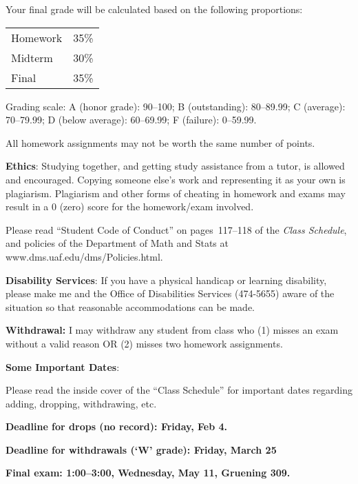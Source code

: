 \documentclass{article}
\begin{document}
Your final grade will be calculated based on the following proportions:

\hskip2cm
\begin{tabular}{ll}
Homework & 35\%\\
Midterm & 30\%\\
Final & 35\%
\end{tabular}

Grading scale:
A (honor grade): 90--100;
B (outstanding): 80--89.99;
C (average): 70--79.99;
D (below average): 60--69.99;
F (failure): 0--59.99.

All homework assignments may not be worth the same number of points.

\bigskip
\textbf{\large Ethics}:
Studying together, and getting study assistance from a tutor, is allowed
and encouraged. Copying someone else's work and representing it as your
own is plagiarism. Plagiarism and other forms of cheating in homework
and exams may result in a 0 (zero) score for the homework/exam
involved.

Please read ``Student Code of Conduct'' on pages~117--118 of the
\emph{Class Schedule}, and policies of the Department of Math and Stats
at www.dms.uaf.edu/dms/Policies.html.


\bigskip
\textbf{\large Disability Services}:
If you have a physical handicap or learning disability, please make me
and the Office of Disabilities Services (474-5655) aware of the
situation so that reasonable accommodations can be made.


\bigskip
\textbf{\large Withdrawal:}
I may withdraw any student from class who
(1) misses an exam without a valid reason OR
(2) misses two homework assignments.

\bigskip
\textbf{\large Some Important Dates}:

Please read the inside cover of the ``Class Schedule'' for important
dates regarding adding, dropping, withdrawing, etc.

\bigskip

\textbf{Deadline for drops (no record): Friday, Feb 4.}
\medskip

\textbf{Deadline for withdrawals (`W' grade): Friday, March 25}
\medskip

\textbf{Final exam: 1:00--3:00, Wednesday, May 11, Gruening 309.}
\end{document}
